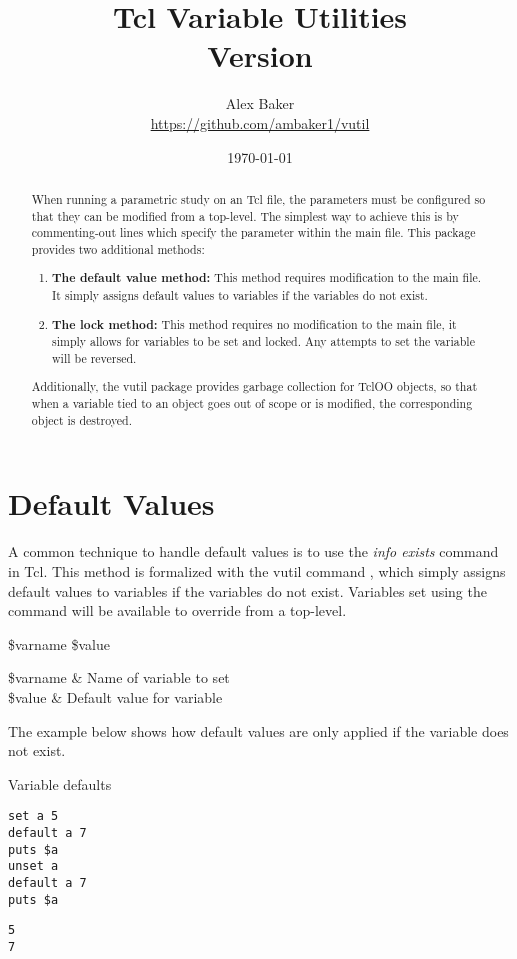 \documentclass{article}
\title{\Huge Tcl Variable Utilities\\\small Version \version}
\author{Alex Baker\\\small\url{https://github.com/ambaker1/vutil}}
\date{\small\today}
\renewcommand{\^}[1]{\textsuperscript{#1}}
\renewcommand{\_}[1]{\textsubscript{#1}}
\begin{document}
\maketitle
\begin{abstract}
When running a parametric study on an Tcl file, the parameters must be configured so that they can be modified from a top-level. 
The simplest way to achieve this is by commenting-out lines which specify the parameter within the main file. 
This package provides two additional methods:
\begin{enumerate}
\item \textbf{The default value method:} This method requires modification to the main file. 
It simply assigns default values to variables if the variables do not exist.
\item \textbf{The lock method:} This method requires no modification to the main file, it simply allows for variables to be set and locked. 
Any attempts to set the variable will be reversed.
\end{enumerate}
Additionally, the vutil package provides garbage collection for TclOO objects, so that when a variable tied to an object goes out of scope or is modified, the corresponding object is destroyed.
\end{abstract}
\clearpage
\section{Default Values}
A common technique to handle default values is to use the \textit{info exists} command in Tcl. This method is formalized with the vutil command , which simply assigns default values to variables if the variables do not exist. Variables set using the  command will be available to override from a top-level.

\begin{syntax}
 \$varname \$value
\end{syntax}
\begin{args}
\$varname & Name of variable to set \\
\$value & Default value for variable
\end{args}

The example below shows how default values are only applied if the variable does not exist.

\begin{example}{Variable defaults}
\begin{lstlisting}
set a 5
default a 7
puts $a
unset a
default a 7
puts $a
\end{lstlisting}
\tcblower
\begin{lstlisting}
5
7
\end{lstlisting}
\end{example}
\clearpage
\end{document}
